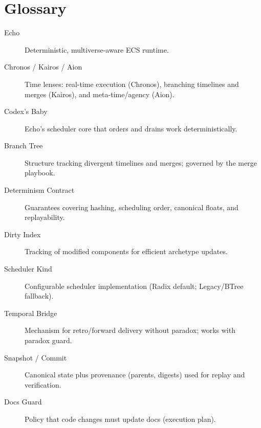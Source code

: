 
\chapter{Glossary}

\begin{description}
    \item[Echo] Deterministic, multiverse-aware ECS runtime.
    \item[Chronos / Kairos / Aion] Time lenses: real-time execution (Chronos), branching timelines and merges (Kairos), and meta-time/agency (Aion).
    \item[Codex’s Baby] Echo’s scheduler core that orders and drains work deterministically.
    \item[Branch Tree] Structure tracking divergent timelines and merges; governed by the merge playbook.
    \item[Determinism Contract] Guarantees covering hashing, scheduling order, canonical floats, and replayability.
    \item[Dirty Index] Tracking of modified components for efficient archetype updates.
    \item[Scheduler Kind] Configurable scheduler implementation (Radix default; Legacy/BTree fallback).
    \item[Temporal Bridge] Mechanism for retro/forward delivery without paradox; works with paradox guard.
    \item[Snapshot / Commit] Canonical state plus provenance (parents, digests) used for replay and verification.
    \item[Docs Guard] Policy that code changes must update docs (execution plan).
\end{description}
